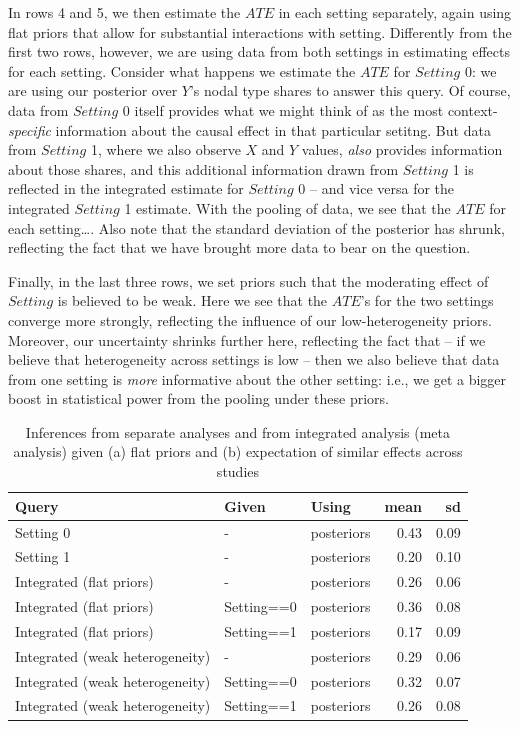 \documentclass[
  12pt,
]{book}
\begin{document}
In rows 4 and 5, we then estimate the \(ATE\) in each setting separately, again using flat priors that allow for substantial interactions with setting. Differently from the first two rows, however, we are using data from both settings in estimating effects for each setting. Consider what happens we estimate the \(ATE\) for \(Setting\) 0: we are using our posterior over \(Y\)'s nodal type shares to answer this query. Of course, data from \(Setting\) 0 itself provides what we might think of as the most context-\emph{specific} information about the causal effect in that particular setitng. But data from \(Setting\) 1, where we also observe \(X\) and \(Y\) values, \emph{also} provides information about those shares, and this additional information drawn from \(Setting\) 1 is reflected in the integrated estimate for \(Setting\) 0 -- and vice versa for the integrated \(Setting\) 1 estimate. With the pooling of data, we see that the \(ATE\) for each setting\ldots. Also note that the standard deviation of the posterior has shrunk, reflecting the fact that we have brought more data to bear on the question.

Finally, in the last three rows, we set priors such that the moderating effect of \(Setting\) is believed to be weak. Here we see that the \(ATE\)'s for the two settings converge more strongly, reflecting the influence of our low-heterogeneity priors. Moreover, our uncertainty shrinks further here, reflecting the fact that -- if we believe that heterogeneity across settings is low -- then we also believe that data from one setting is \emph{more} informative about the other setting: i.e., we get a bigger boost in statistical power from the pooling under these priors.

\begin{table}

\caption{\label{tab:settingmatters}Inferences from separate analyses and from integrated analysis (meta analysis) given (a) flat priors and (b) expectation of similar effects across studies}
\centering
\begin{tabular}[t]{l|l|l|r|r}
\hline
Query & Given & Using & mean & sd\\
\hline
Setting 0 & - & posteriors & 0.43 & 0.09\\
\hline
Setting 1 & - & posteriors & 0.20 & 0.10\\
\hline
Integrated (flat priors) & - & posteriors & 0.26 & 0.06\\
\hline
Integrated (flat priors) & Setting==0 & posteriors & 0.36 & 0.08\\
\hline
Integrated (flat priors) & Setting==1 & posteriors & 0.17 & 0.09\\
\hline
Integrated (weak heterogeneity) & - & posteriors & 0.29 & 0.06\\
\hline
Integrated (weak heterogeneity) & Setting==0 & posteriors & 0.32 & 0.07\\
\hline
Integrated (weak heterogeneity) & Setting==1 & posteriors & 0.26 & 0.08\\
\hline
\end{tabular}
\end{table}
\end{document}
